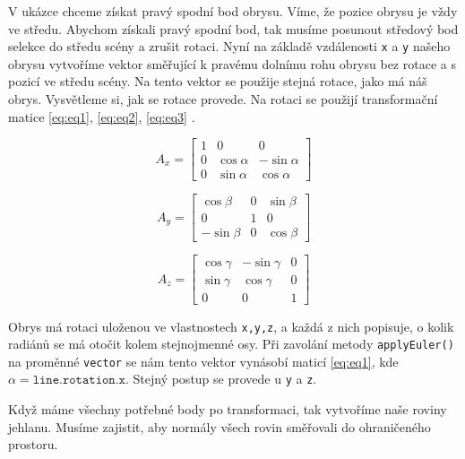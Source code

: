 \documentclass[czech,bachelor,dept420,male,cpdeclaration]{diploma}
\begin{document}
 


V ukázce chceme získat pravý spodní bod obrysu. Víme, že pozice obrysu je vždy ve středu. Abychom získali pravý spodní bod, tak musíme posunout středový bod selekce do středu scény a zrušit rotaci. Nyní na základě vzdálenosti \texttt{x} a \texttt{y} našeho obrysu vytvoříme vektor směřující k pravému dolnímu rohu obrysu bez rotace a s pozicí ve středu scény. Na tento vektor se použije stejná rotace, jako má náš obrys. Vysvětleme si, jak se rotace provede. Na rotaci se použijí transformační matice \eqref{eq:eq1}, \eqref{eq:eq2}, \eqref{eq:eq3} \cite{sojka_2003}.

\begin{equation}
		A_x =
		\begin{bmatrix}%
    1 & 0 & 0 \\
		0 & \cos \alpha & -\sin \alpha \\ 
		0 & \sin \alpha & \cos \alpha
    \end{bmatrix}
\label{eq:eq1}
\end{equation}

\begin{equation}
		A_y =
		\begin{bmatrix}%
    \cos \beta & 0 & \sin \beta \\
		0 & 1 & 0 \\ 
		-\sin \beta & 0 & \cos \beta
    \end{bmatrix}
\label{eq:eq2}
\end{equation}

\begin{equation}
		A_z =
		\begin{bmatrix}%
    \cos \gamma & -\sin \gamma & 0 \\
		\sin \gamma & \cos \gamma & 0 \\ 
		0 & 0 & 1
    \end{bmatrix}
\label{eq:eq3}
\end{equation}

Obrys má rotaci uloženou ve vlastnostech \texttt{x,y,z}, a každá z nich popisuje, o kolik radiánů se má otočit kolem stejnojmenné osy. Při zavolání metody \texttt{applyEuler()} na proměnné \texttt{vector} se nám tento vektor vynásobí maticí \eqref{eq:eq1}, kde $ \alpha = \texttt{line.rotation.x} $. Stejný postup se provede u \texttt{y} a \texttt{z}.  

Když máme všechny potřebné body po transformaci, tak vytvoříme naše roviny jehlanu. Musíme zajistit, aby normály všech rovin směřovali do ohraničeného prostoru. 
\end{document}
